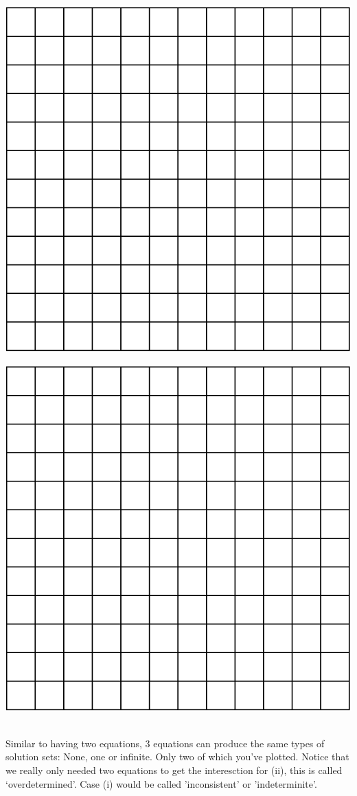 \documentclass{article}
\begin{document}
\begin{flushleft}
\begin{minipage}{3in}
\includegraphics[scale=.75]{grid_12_by_12.eps}
\end{minipage}
\begin{minipage}{3in}
\includegraphics[scale=.75]{grid_12_by_12.eps}
\end{minipage}
\vspace{0.3in}\\
Similar to having two equations, 3 equations can produce the same types of solution sets: None, one or infinite. Only two of which you've plotted. Notice that we really only needed two equations to get the interesction for (ii), this is called `overdetermined'. Case (i) would be called 'inconsistent' or 'indeterminite'. 


\end{flushleft}
\end{document}
